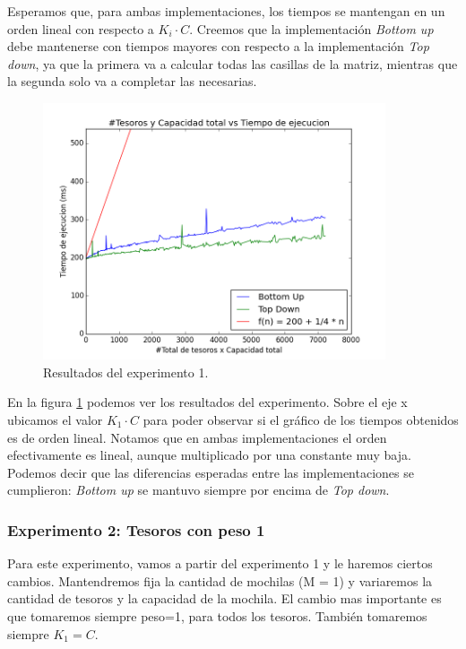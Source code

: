 \par Esperamos que, para ambas implementaciones, los tiempos se mantengan en un orden lineal con respecto a $K_i \cdot C$. Creemos que la implementación \textit{Bottom up} debe mantenerse con tiempos mayores con respecto a la implementación \textit{Top down}, ya que la primera va a calcular todas las casillas de la matriz, mientras que la segunda solo va a completar las necesarias.

\begin{figure}[H]
	\centering
	\includegraphics[width=0.9\textwidth]{Problema3/img/exp1_tiempos_general.png}
	\caption{Resultados del experimento 1.}
	\label{fig: exp1_tiempos_general}
\end{figure}

\par En la figura \ref{fig: exp1_tiempos_general} podemos ver los resultados del experimento. Sobre el eje x ubicamos el valor $K_1 \cdot C$ para poder observar si el gráfico de los tiempos obtenidos es de orden lineal. Notamos que en ambas implementaciones el orden efectivamente es lineal, aunque multiplicado por una constante muy baja. Podemos decir que las diferencias esperadas entre las implementaciones se cumplieron: \textit{Bottom up} se mantuvo siempre por encima de \textit{Top down}.

\subsubsection{Experimento 2: Tesoros con peso 1}

\par Para este experimento, vamos a partir del experimento 1 y le haremos ciertos cambios. Mantendremos fija la cantidad de mochilas (M = 1) y variaremos la cantidad de tesoros y la capacidad de la mochila. El cambio mas importante es que tomaremos siempre peso=1, para todos los tesoros. También tomaremos siempre $K_1 = C$.

